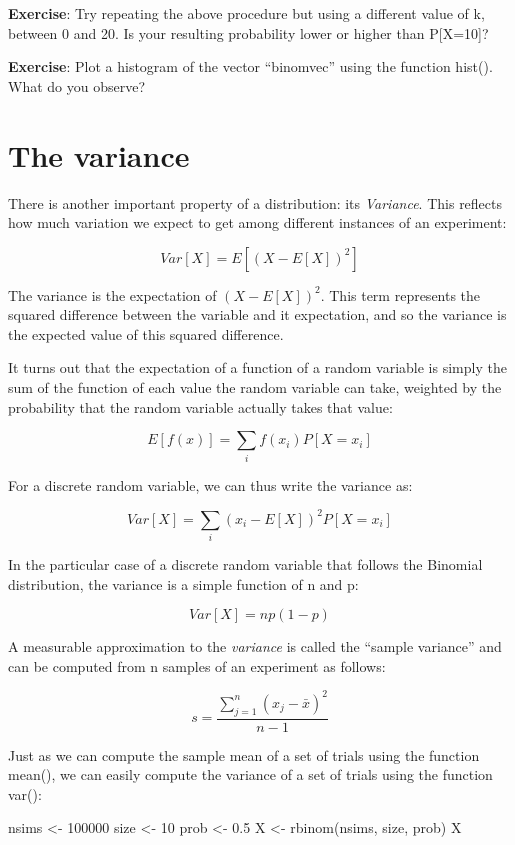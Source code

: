 \documentclass[
]{book}
\newenvironment{Shaded}{\begin{snugshade}}{\end{snugshade}}
\newcommand{\DecValTok}[1]{\textcolor[rgb]{0.00,0.00,0.81}{#1}}
\newcommand{\FloatTok}[1]{\textcolor[rgb]{0.00,0.00,0.81}{#1}}
\newcommand{\FunctionTok}[1]{\textcolor[rgb]{0.00,0.00,0.00}{#1}}
\newcommand{\NormalTok}[1]{#1}
\newcommand{\OtherTok}[1]{\textcolor[rgb]{0.56,0.35,0.01}{#1}}
\begin{document}
\textbf{Exercise}: Try repeating the above procedure but using a different value of k, between 0 and 20. Is your resulting probability lower or higher than P{[}X=10{]}?

\textbf{Exercise}: Plot a histogram of the vector ``binomvec'' using the function hist(). What do you observe?

\hypertarget{the-variance}{%
\section{The variance}\label{the-variance}}

There is another important property of a distribution: its \emph{Variance}. This reflects how much variation we expect to get among different instances of an experiment:

\[Var[X] = E[(X-E[X])^{2}]\]

The variance is the expectation of \((X-E[X])^{2}\). This term represents the squared difference between the variable and it expectation, and so the variance is the expected value of this squared difference.

It turns out that the expectation of a function of a random variable is simply the sum of the function of each value the random variable can take, weighted by the probability that the random variable actually takes that value:

\[E[f(x)] = \sum_{i}f(x_i)P[X=x_i]\]

For a discrete random variable, we can thus write the variance as:

\[Var[X] = \sum_{i}(x_i-E[X])^{2}P[X=x_i]\]

In the particular case of a discrete random variable that follows the Binomial distribution, the variance is a simple function of n and p:

\[Var[X] = n p(1-p)\]

A measurable approximation to the \emph{variance} is called the ``sample variance'' and can be computed from n samples of an experiment as follows:

\[s = \frac{\sum_{j=1}^{n}(x_{j} - \bar{x})^{2}}{n-1}\]

Just as we can compute the sample mean of a set of trials using the function mean(), we can easily compute the variance of a set of trials using the function var():

\begin{Shaded}
\begin{Highlighting}[]
\NormalTok{nsims }\OtherTok{\textless{}{-}} \DecValTok{100000}
\NormalTok{size }\OtherTok{\textless{}{-}} \DecValTok{10}
\NormalTok{prob }\OtherTok{\textless{}{-}} \FloatTok{0.5}
\NormalTok{X }\OtherTok{\textless{}{-}} \FunctionTok{rbinom}\NormalTok{(nsims, size, prob)}
\NormalTok{X}
\end{Highlighting}
\end{Shaded}
\end{document}
